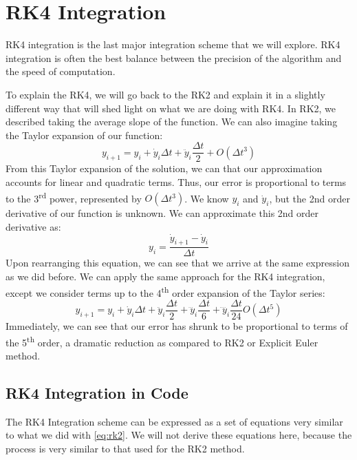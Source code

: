 \documentclass[12pt]{report}
\begin{document}
\section{RK4 Integration}\label{sec: rk4}
RK4 integration is the last major integration scheme that we will explore. RK4 integration is often the best balance between the precision of the algorithm and the speed of computation. 

To explain the RK4, we will go back to the RK2 and explain it in a slightly different way that will shed light on what we are doing with RK4. In RK2, we described taking the average slope of the function. We can also imagine taking the Taylor expansion of our function:
$$y_{i+1}=y_i+\dot{y}_i\Delta t+\ddot{y}_i\frac{\Delta t}{2}+O\left(\Delta t^3\right)$$
From this Taylor expansion of the solution, we can that our approximation accounts for linear and quadratic terms. Thus, our error is proportional to terms to the 3\textsuperscript{rd} power, represented by $O(\Delta t^3)$. We know $y_i$ and $\dot{y}_i$, but the 2nd order derivative of our function is unknown. We can approximate this 2nd order derivative as:
$$y_i=\frac{\dot{y}_{i+1}-\dot{y}_i}{\Delta t}$$
Upon rearranging this equation, we can see that we arrive at the same expression as we did before. We can apply the same approach for the RK4 integration, except we consider terms up to the 4\textsuperscript{th} order expansion of the Taylor series:
$$y_{i+1}=y_i+\dot{y}_i\Delta t+\ddot{y}_i\frac{\Delta t}{2}+\dddot{y}_i\frac{\Delta t}{6}+\ddddot{y}_i\frac{\Delta t}{24}O\left(\Delta t^5\right)$$
Immediately, we can see that our error has shrunk to be proportional to terms of the 5\textsuperscript{th} order, a dramatic reduction as compared to RK2 or Explicit Euler method.

\subsection{RK4 Integration in Code}
The RK4 Integration scheme can be expressed as a set of equations very similar to what we did with \eqref{eq:rk2}. We will not derive these equations here, because the process is very similar to that used for the RK2 method.
\end{document}
